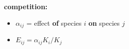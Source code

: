\textbf{competition:}
\begin{itemize}
\item $\alpha_{ij}$ = effect \textbf{of} species $i$ \textbf{on} species $j$
\item $E_{ij} = \alpha_{ij} K_i/K_j$
\end{itemize}
